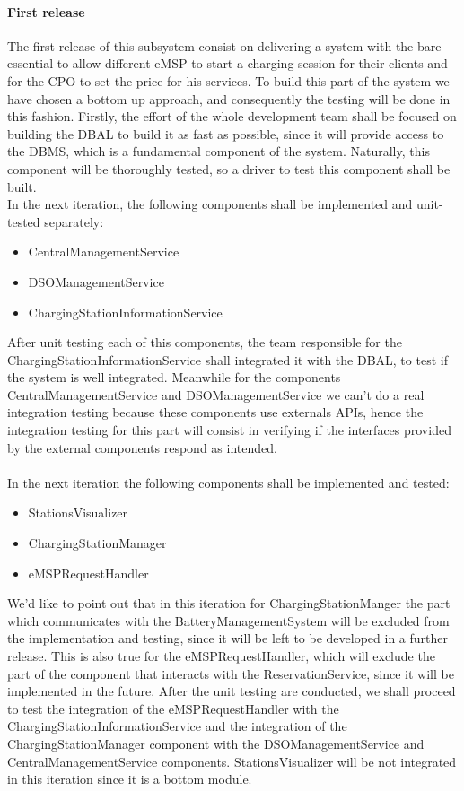 \paragraph{First release}
The first release of this subsystem consist on delivering a system with the bare essential to allow different eMSP to start a charging session for their clients and for the CPO to set the price for his services. To build this part of the system we have chosen a bottom up approach, and consequently the testing will be done in this fashion. Firstly, the effort of the whole development team shall be focused on building the DBAL to build it as fast as possible, since it will provide access to the DBMS, which is a fundamental component of the system. Naturally, this component will be thoroughly tested, so a driver to test this component shall be built.\\
In the next iteration, the following components shall be implemented and unit-tested separately:
\begin{itemize}
    \item CentralManagementService
    \item DSOManagementService
    \item ChargingStationInformationService
\end{itemize}
After unit testing each of this components, the team responsible for the ChargingStationInformationService shall integrated it with the DBAL, to test if the system is well integrated. Meanwhile for the components CentralManagementService and DSOManagementService we can't do a real integration testing because these components use externals APIs, hence the integration testing for this part will consist in verifying if the interfaces provided by the external components respond as intended.\\
\\
In the next iteration the following components shall be implemented and tested:
\begin{itemize}
    \item StationsVisualizer
    \item ChargingStationManager
    \item eMSPRequestHandler
\end{itemize}
We'd like to point out that in this iteration for ChargingStationManger the part which communicates with the BatteryManagementSystem will be excluded from the implementation and testing, since it will be left to be developed in a further release. This is also true for the eMSPRequestHandler, which will exclude the part of the component that interacts with the ReservationService, since it will be implemented in the future. After the unit testing are conducted, we shall proceed to test the integration of the eMSPRequestHandler with the ChargingStationInformationService and the integration of the ChargingStationManager component with the DSOManagementService and CentralManagementService components. StationsVisualizer will be not integrated in this iteration since it is a bottom module.\\

